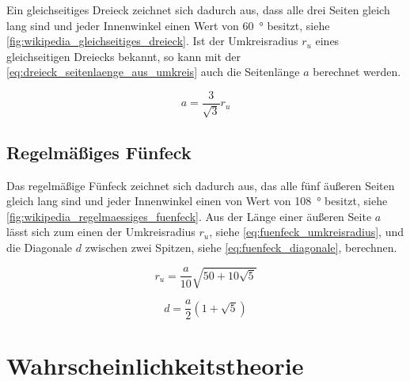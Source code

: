 Ein gleichseitiges Dreieck zeichnet sich dadurch aus, dass alle drei Seiten gleich lang sind und jeder Innenwinkel einen Wert von \SI{60}{\degree} besitzt, siehe \autoref{fig:wikipedia_gleichseitiges_dreieck}. Ist der Umkreisradius $r_u$ eines gleichseitigen Dreiecks bekannt, so kann mit der \autoref{eq:dreieck_seitenlaenge_aus_umkreis} auch die Seitenlänge $a$ berechnet werden.

\begin{equation}
a = \frac{3}{\sqrt{3}} r_u \label{eq:dreieck_seitenlaenge_aus_umkreis}
\end{equation}


%
%
%
\subsection{Regelmäßiges Fünfeck}

Das regelmäßige Fünfeck zeichnet sich dadurch aus, das alle fünf äußeren Seiten gleich lang sind und jeder Innenwinkel einen von Wert von \SI{108}{\degree} besitzt, siehe \autoref{fig:wikipedia_regelmaessiges_fuenfeck}. Aus der Länge einer äußeren Seite $a$ lässt sich zum einen der Umkreisradius $r_u$, siehe \autoref{eq:fuenfeck_umkreisradius}, und die Diagonale $d$ zwischen zwei Spitzen, siehe \autoref{eq:fuenfeck_diagonale}, berechnen.

\begin{equation}
r_u = \frac{a}{10} \sqrt{50 + 10 \sqrt{5}} \label{eq:fuenfeck_umkreisradius}
\end{equation}

\begin{equation}
d = \frac{a}{2} \left(1 + \sqrt{5} \right) \label{eq:fuenfeck_diagonale}
\end{equation}


%
%
\section{Wahrscheinlichkeitstheorie}

